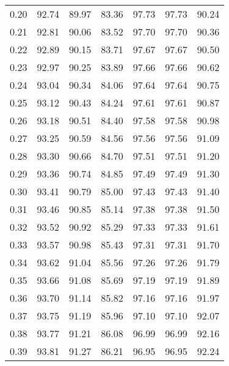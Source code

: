 \begin{tabular}{|c|c|c|c|c|c|c|}
      0.20 &     92.74 &     89.97 &      83.36 &   97.73 &      97.73 &         90.24 \\
      0.21 &     92.81 &     90.06 &      83.52 &   97.70 &      97.70 &         90.36 \\
      0.22 &     92.89 &     90.15 &      83.71 &   97.67 &      97.67 &         90.50 \\
      0.23 &     92.97 &     90.25 &      83.89 &   97.66 &      97.66 &         90.62 \\
      0.24 &     93.04 &     90.34 &      84.06 &   97.64 &      97.64 &         90.75 \\
      0.25 &     93.12 &     90.43 &      84.24 &   97.61 &      97.61 &         90.87 \\
      0.26 &     93.18 &     90.51 &      84.40 &   97.58 &      97.58 &         90.98 \\
      0.27 &     93.25 &     90.59 &      84.56 &   97.56 &      97.56 &         91.09 \\
      0.28 &     93.30 &     90.66 &      84.70 &   97.51 &      97.51 &         91.20 \\
      0.29 &     93.36 &     90.74 &      84.85 &   97.49 &      97.49 &         91.30 \\
      0.30 &     93.41 &     90.79 &      85.00 &   97.43 &      97.43 &         91.40 \\
      0.31 &     93.46 &     90.85 &      85.14 &   97.38 &      97.38 &         91.50 \\
      0.32 &     93.52 &     90.92 &      85.29 &   97.33 &      97.33 &         91.61 \\
      0.33 &     93.57 &     90.98 &      85.43 &   97.31 &      97.31 &         91.70 \\
      0.34 &     93.62 &     91.04 &      85.56 &   97.26 &      97.26 &         91.79 \\
      0.35 &     93.66 &     91.08 &      85.69 &   97.19 &      97.19 &         91.89 \\
      0.36 &     93.70 &     91.14 &      85.82 &   97.16 &      97.16 &         91.97 \\
      0.37 &     93.75 &     91.19 &      85.96 &   97.10 &      97.10 &         92.07 \\
      0.38 &     93.77 &     91.21 &      86.08 &   96.99 &      96.99 &         92.16 \\
      0.39 &     93.81 &     91.27 &      86.21 &   96.95 &      96.95 &         92.24 \\

\end{tabular}

